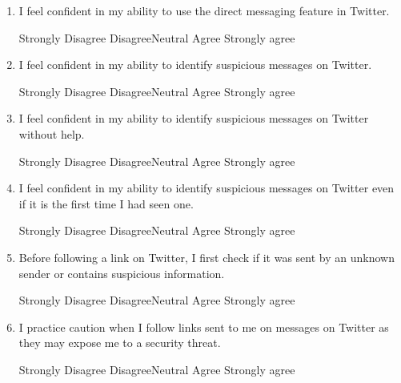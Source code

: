 \begin{enumerate}[noitemsep]
\item I feel confident in my ability to use the direct messaging feature in Twitter.
\par Strongly Disagree \hspace{1cm} Disagree\hspace{1cm}Neutral\hspace{1cm} Agree\hspace{1cm} Strongly agree
\item I feel confident in my ability to identify suspicious messages on Twitter.
\par Strongly Disagree \hspace{1cm} Disagree\hspace{1cm}Neutral\hspace{1cm} Agree\hspace{1cm} Strongly agree
\item I feel confident in my ability to identify suspicious messages on Twitter without help.
\par Strongly Disagree \hspace{1cm} Disagree\hspace{1cm}Neutral\hspace{1cm} Agree\hspace{1cm} Strongly agree
\item I feel confident in my ability to identify suspicious messages on Twitter even if it is the first time I had seen one.
\par Strongly Disagree \hspace{1cm} Disagree\hspace{1cm}Neutral\hspace{1cm} Agree\hspace{1cm} Strongly agree
\item Before following a link on Twitter, I first check if it was sent by an unknown sender or contains suspicious information.
\par Strongly Disagree \hspace{1cm} Disagree\hspace{1cm}Neutral\hspace{1cm} Agree\hspace{1cm} Strongly agree
\item I practice caution when I follow links sent to me on messages on Twitter as they may expose me to a security threat.
\par Strongly Disagree \hspace{1cm} Disagree\hspace{1cm}Neutral\hspace{1cm} Agree\hspace{1cm} Strongly agree

\end{enumerate}
